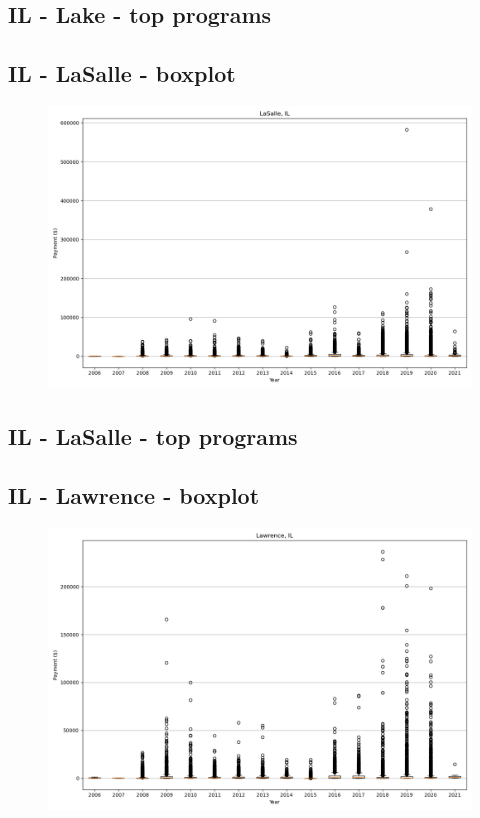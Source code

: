 \subsection*{IL - Lake - top programs}

\newpage
\subsection*{IL - LaSalle - boxplot}
\begin{figure}[h]
\centering
\includegraphics[width=7in]{../output/boxplots/counties/LaSalle-IL_boxplot.png}
\end{figure}


\subsection*{IL - LaSalle - top programs}

\newpage
\subsection*{IL - Lawrence - boxplot}
\begin{figure}[h]
\centering
\includegraphics[width=7in]{../output/boxplots/counties/Lawrence-IL_boxplot.png}
\end{figure}


